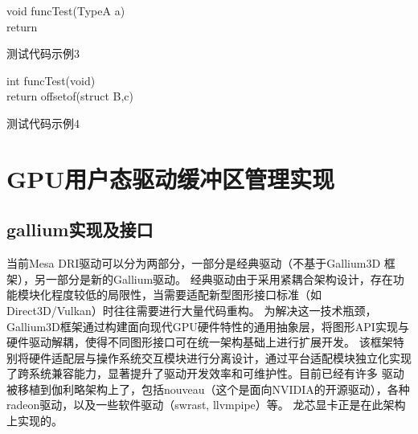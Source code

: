 \begin{minipage}{0.45\textwidth}
  \begin{algorithm}[H]
    \SetAlgoLined
    void funcTest(TypeA a){\\
      return \;
    }
    \caption{测试代码示例3}
    \label{algo:algorithm4}
  \end{algorithm}
\end{minipage}
\hfill
\begin{minipage}{0.45\textwidth}
  \begin{algorithm}[H]
    \SetAlgoLined
    int funcTest(void){\\
      return offsetof(struct B,c) \;
    }
    \caption{测试代码示例4}
    \label{algo:algorithm5}
  \end{algorithm}
\end{minipage}


\section{GPU用户态驱动缓冲区管理实现}


\subsection{gallium实现及接口}
当前Mesa DRI驱动可以分为两部分，一部分是经典驱动（不基于Gallium3D 框架），另一部分是新的Gallium驱动。 
经典驱动由于采用紧耦合架构设计，存在功能模块化程度较低的局限性，当需要适配新型图形接口标准（如Direct3D/Vulkan）时往往需要进行大量代码重构。
为解决这一技术瓶颈，Gallium3D框架通过构建面向现代GPU硬件特性的通用抽象层，将图形API实现与硬件驱动解耦，使得不同图形接口可在统一架构基础上进行扩展开发。
该框架特别将硬件适配层与操作系统交互模块进行分离设计，通过平台适配模块独立化实现了跨系统兼容能力，显著提升了驱动开发效率和可维护性。目前已经有许多
驱动被移植到伽利略架构上了，包括nouveau（这个是面向NVIDIA的开源驱动），各种radeon驱动，以及一些软件驱动（swrast, llvmpipe）等。
龙芯显卡正是在此架构上实现的。

